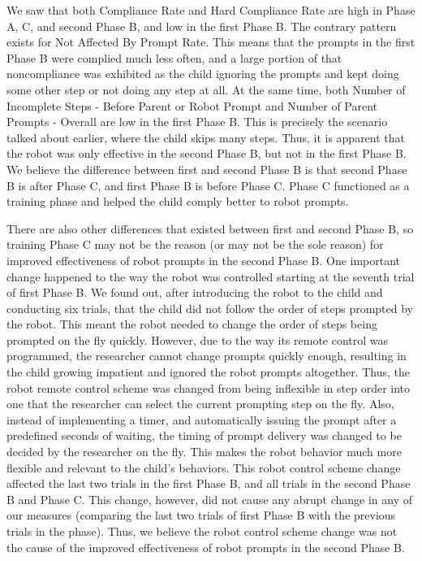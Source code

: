 We saw that both Compliance Rate and Hard Compliance Rate are high in Phase A, C, and second Phase B, and low in the first Phase B.  The contrary pattern exists for Not Affected By Prompt Rate.  This means that the prompts in the first Phase B were complied much less often, and a large portion of that noncompliance was exhibited as the child ignoring the prompts and kept doing some other step or not doing any step at all.  At the same time, both Number of Incomplete Steps - Before Parent or Robot Prompt and Number of Parent Prompts - Overall are low in the first Phase B.  This is precisely the scenario talked about earlier, where the child skips many steps.  Thus, it is apparent that the robot was only effective in the second Phase B, but not in the first Phase B.  We believe the difference between first and second Phase B is that second Phase B is after Phase C, and first Phase B is before Phase C.  Phase C functioned as a training phase and helped the child comply better to robot prompts.

There are also other differences that existed between first and second Phase B, so training Phase C may not be the reason (or may not be the sole reason) for improved effectiveness of robot prompts in the second Phase B.  One important change happened to the way the robot was controlled starting at the seventh trial of first Phase B.  We found out, after introducing the robot to the child and conducting six trials, that the child did not follow the order of steps prompted by the robot.  This meant the robot needed to change the order of steps being prompted on the fly quickly.  However, due to the way its remote control was programmed, the researcher cannot change prompts quickly enough, resulting in the child growing impatient and ignored the robot prompts altogether.  Thus, the robot remote control scheme was changed from being inflexible in step order into one that the researcher can select the current prompting step on the fly.  Also, instead of implementing a timer, and automatically issuing the prompt after a predefined seconds of waiting, the timing of prompt delivery was changed to be decided by the researcher on the fly.  This makes the robot behavior much more flexible and relevant to the child's behaviors.  This robot control scheme change affected the last two trials in the first Phase B, and all trials in the second Phase B and Phase C.  This change, however, did not cause any abrupt change in any of our measures (comparing the last two trials of first Phase B with the previous trials in the phase).  Thus, we believe the robot control scheme change was not the cause of the improved effectiveness of robot prompts in the second Phase B.

